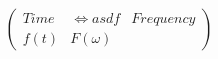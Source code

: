 \documentclass[preview]{standalone}
\begin{document}
\begin{align*}
\left( \begin{array}{cl} Time & \Longleftrightarrow asdf & Frequency \\ f(t) & F(\omega) \end{array} \right)
\end{align*}
\end{document}
